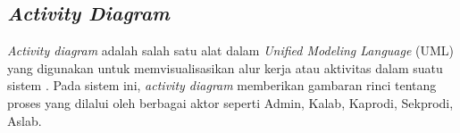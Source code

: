 
\subsection{\textit{Activity Diagram}}
\textit{Activity diagram} adalah salah satu alat dalam \textit{Unified Modeling Language} (UML) yang digunakan untuk memvisualisasikan alur kerja atau aktivitas dalam suatu sistem \cite{linzhang2004generating}. Pada sistem ini, \textit{activity diagram} memberikan gambaran rinci tentang proses yang dilalui oleh berbagai aktor seperti Admin, Kalab, Kaprodi, Sekprodi, Aslab.

